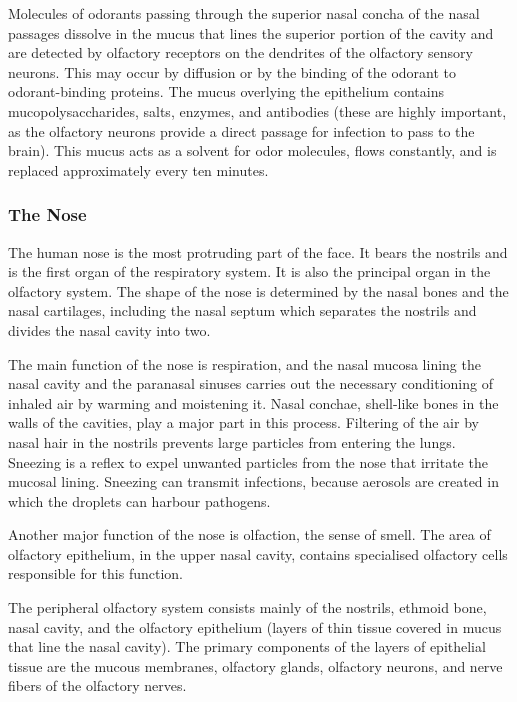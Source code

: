 Molecules of odorants passing through the superior nasal concha of the
nasal passages dissolve in the mucus that lines the superior portion of
the cavity and are detected by olfactory receptors on the dendrites of
the olfactory sensory neurons. This may occur by diffusion or by the
binding of the odorant to odorant-binding proteins. The mucus overlying
the epithelium contains mucopolysaccharides, salts, enzymes, and
antibodies (these are highly important, as the olfactory neurons provide
a direct passage for infection to pass to the brain). This mucus acts as
a solvent for odor molecules, flows constantly, and is replaced
approximately every ten minutes.

\hypertarget{the-nose}{%
\subsubsection{The Nose}\label{the-nose}}

The human nose is the most protruding part of the face. It bears the
nostrils and is the first organ of the respiratory system. It is also
the principal organ in the olfactory system. The shape of the nose is
determined by the nasal bones and the nasal cartilages, including the
nasal septum which separates the nostrils and divides the nasal cavity
into two.

The main function of the nose is respiration, and the nasal mucosa
lining the nasal cavity and the paranasal sinuses carries out the
necessary conditioning of inhaled air by warming and moistening it.
Nasal conchae, shell-like bones in the walls of the cavities, play a
major part in this process. Filtering of the air by nasal hair in the
nostrils prevents large particles from entering the lungs. Sneezing is a
reflex to expel unwanted particles from the nose that irritate the
mucosal lining. Sneezing can transmit infections, because aerosols are
created in which the droplets can harbour pathogens.

Another major function of the nose is olfaction, the sense of smell. The
area of olfactory epithelium, in the upper nasal cavity, contains
specialised olfactory cells responsible for this function.

The peripheral olfactory system consists mainly of the nostrils, ethmoid
bone, nasal cavity, and the olfactory epithelium (layers of thin tissue
covered in mucus that line the nasal cavity). The primary components of
the layers of epithelial tissue are the mucous membranes, olfactory
glands, olfactory neurons, and nerve fibers of the olfactory nerves.

